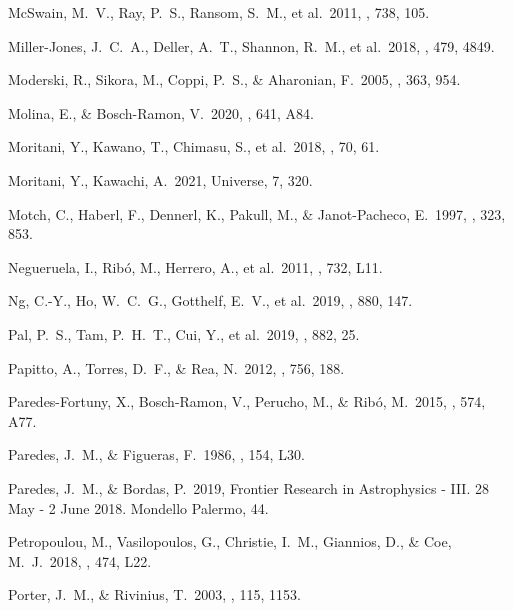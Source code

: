 \documentclass{aa}
\begin{document}
\begin{thebibliography}{}
 McSwain, M.~V., Ray, P.~S., Ransom, S.~M., et al.\ 2011, \apj, 738, 105.

 Miller-Jones, J.~C.~A., Deller, A.~T., Shannon, R.~M., et al.\ 2018, \mnras, 479, 4849.

 Moderski, R., Sikora, M., Coppi, P.~S., \& Aharonian, F.\ 2005, \mnras, 363, 954.

 Molina, E., \& Bosch-Ramon, V.\ 2020, \aap, 641, A84.

 Moritani, Y., Kawano, T., Chimasu, S., et al.\ 2018, \pasj, 70, 61.

 Moritani, Y., Kawachi, A.\ 2021, Universe, 7, 320.

 Motch, C., Haberl, F., Dennerl, K., Pakull, M., \& Janot-Pacheco, E.\ 1997, \aap, 323, 853.

 Negueruela, I., Rib{\'o}, M., Herrero, A., et al.\ 2011, \apjl, 732, L11.

 Ng, C.-Y., Ho, W.~C.~G., Gotthelf, E.~V., et al.\ 2019, \apj, 880, 147.

 Pal, P.~S., Tam, P.~H.~T., Cui, Y., et al.\ 2019, \apj, 882, 25.

 Papitto, A., Torres, D.~F., \& Rea, N.\ 2012, \apj, 756, 188.

 Paredes-Fortuny, X., Bosch-Ramon, V., Perucho, M., \& Rib{\'o}, M.\ 2015, \aap, 574, A77.

 Paredes, J.~M., \& Figueras, F.\ 1986, \aap, 154, L30.

 Paredes, J.~M., \& Bordas, P.\ 2019, Frontier Research in Astrophysics - III. 28 May - 2 June 2018. Mondello Palermo, 44.

 Petropoulou, M., Vasilopoulos, G., Christie, I.~M., Giannios, D., \& Coe, M.~J.\ 2018, \mnras, 474, L22.

 Porter, J.~M., \& Rivinius, T.\ 2003, \pasp, 115, 1153.


\end{thebibliography}
\end{document}
